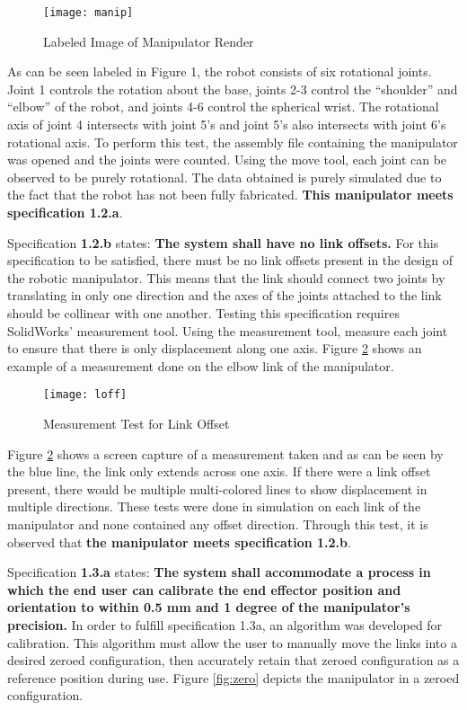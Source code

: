 \begin{figure}[htp]
  \centering
  \texttt{[image: manip]}
  \caption{Labeled Image of Manipulator Render}
  \label{fig:manip}
\end{figure}

As can be seen labeled in Figure 1, the robot consists of six rotational joints. Joint 1 controls the rotation about the base,  joints 2-3 control the “shoulder” and “elbow” of the robot, and joints 4-6 control the  spherical wrist. The rotational axis of joint 4 intersects with joint 5’s and joint 5’s also intersects with joint 6’s rotational axis. To perform this test, the assembly file containing the manipulator was opened and the joints were counted. Using the move tool, each joint can be observed to be purely rotational. The data obtained is purely simulated due to the fact that the robot has not been fully fabricated. \textbf{This manipulator meets specification 1.2.a}.

Specification \textbf{1.2.b} states: \textbf{The system shall have no link offsets.} For this specification to be satisfied, there must be no link offsets present in the design of the robotic manipulator. This means that the link should connect two joints by translating in only one direction and the axes of the joints attached to the link should be collinear with one another. Testing this specification requires SolidWorks’ measurement tool. Using the measurement tool, measure each joint to ensure that there is only displacement along one axis. Figure \ref{fig:loff} shows an example of a measurement done on the elbow link of the manipulator.

\begin{figure}[htp]
  \centering
  \texttt{[image: loff]}
  \caption{Measurement Test for Link Offset}
  \label{fig:loff}
\end{figure}

Figure \ref{fig:loff} shows a screen capture of a measurement taken and as can be seen by the blue line, the link only extends across one axis. If there were a link offset present, there would be multiple multi-colored lines to show displacement in multiple directions. These tests were done in simulation on each link of the manipulator and none contained any offset direction. Through this test, it is observed that \textbf{the manipulator meets specification 1.2.b}.

Specification \textbf{1.3.a} states: \textbf{The system shall accommodate a process in which the end user can calibrate the end effector position and orientation to within 0.5 mm and 1 degree of the manipulator’s precision.} In order to fulfill specification 1.3a, an algorithm was developed for calibration. This algorithm must allow the user to manually move the links into a desired zeroed configuration, then accurately retain that zeroed configuration as a reference position during use. Figure \ref{fig:zero} depicts the manipulator in a zeroed configuration.

